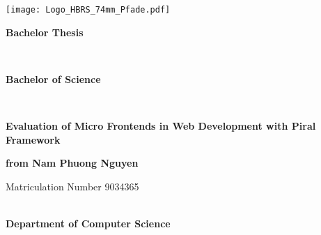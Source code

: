 \documentclass[a4paper]{book}
\def\autor{Nam Phuong Nguyen}
\def\datum{04. July 2022}
\begin{document}
\sloppy
\pagestyle{headings}

\begin{titlepage}
  \begin{minipage}{0.5\textwidth}
	\raggedright 
	\texttt{[image: Logo\_HBRS\_74mm\_Pfade.pdf]}
  \end{minipage}
  \hspace{1cm}
  \begin{minipage}{0.5\textwidth}
	\raggedleft 
  \end{minipage}
  
  \renewcommand{\baselinestretch}{1.4}\normalsize
  \vspace{2cm}
  \begin{center}

    \begin{Huge}\textbf{Bachelor Thesis}\end{Huge} \\
    \vspace{0.8cm}
    \begin{Large}\textbf{Bachelor of Science}\end{Large} \\

    \vspace{2.2cm}
    \renewcommand{\baselinestretch}{1.2}\normalsize
    \begin{huge}
      \textbf{Evaluation of Micro Frontends in Web Development with Piral Framework
 \\}
    \end{huge}
    \renewcommand{\baselinestretch}{1.5}\normalsize
    \vspace{0.7cm}

    \begin{Large}\textbf{from \autor\ \\}
    \end{Large}
    Matriculation Number 9034365 \\ ~\\
    \begin{Large}
        \textbf{Department of Computer Science}
    \end{Large}

  \end{center}

  \vspace{5.0cm}

\end{titlepage}
\end{document}
